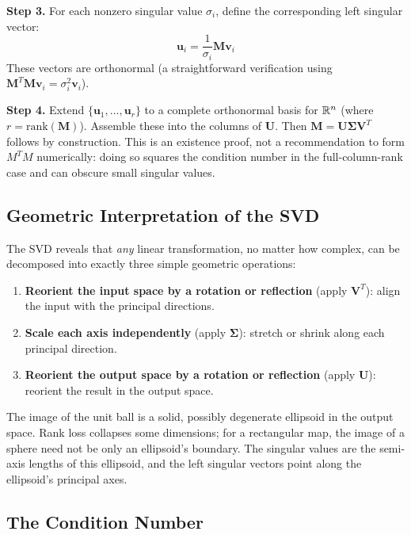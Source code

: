 \textbf{Step 3.} For each nonzero singular value $\sigma_i$, define the corresponding left singular vector:
\begin{equation}
    \mathbf{u}_i = \frac{1}{\sigma_i} \mathbf{M} \mathbf{v}_i
\end{equation}
These vectors are orthonormal (a straightforward verification using $\mathbf{M}^T\mathbf{M}\mathbf{v}_i = \sigma_i^2 \mathbf{v}_i$).

\textbf{Step 4.} Extend $\{\mathbf{u}_1, \ldots, \mathbf{u}_r\}$ to a complete orthonormal basis for $\mathbb{R}^n$ (where $r = \text{rank}(\mathbf{M})$). Assemble these into the columns of $\mathbf{U}$. Then $\mathbf{M} = \mathbf{U}\boldsymbol{\Sigma}\mathbf{V}^T$ follows by construction. This is an existence proof, not a recommendation to form $M^TM$ numerically: doing so squares the condition number in the full-column-rank case and can obscure small singular values.

\subsection{Geometric Interpretation of the SVD}

The SVD reveals that \emph{any} linear transformation, no matter how complex, can be decomposed into exactly three simple geometric operations:
\begin{enumerate}
    \item \textbf{Reorient the input space by a rotation or reflection} (apply $\mathbf{V}^T$): align the input with the principal directions.
    \item \textbf{Scale each axis independently} (apply $\boldsymbol{\Sigma}$): stretch or shrink along each principal direction.
    \item \textbf{Reorient the output space by a rotation or reflection} (apply $\mathbf{U}$): reorient the result in the output space.
\end{enumerate}

The image of the unit ball is a solid, possibly degenerate ellipsoid in the output space. Rank loss collapses some dimensions; for a rectangular map, the image of a sphere need not be only an ellipsoid's boundary. The singular values are the semi-axis lengths of this ellipsoid, and the left singular vectors point along the ellipsoid's principal axes.

\subsection{The Condition Number}
\label{subsec:condition_number}

